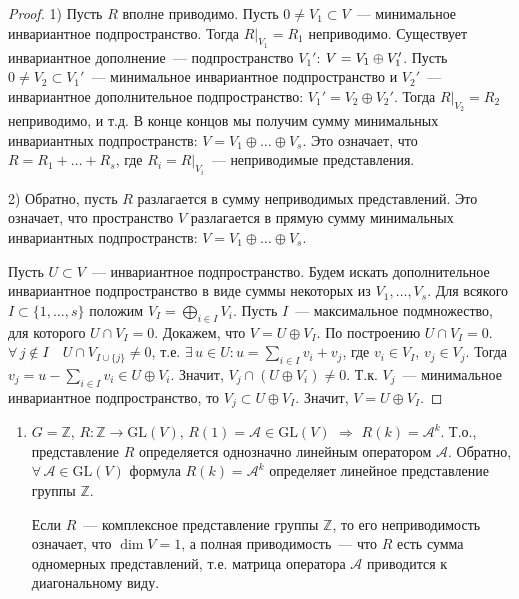 \documentclass[a4paper]{article}
\newcommand*{\p}[1]{#1\nobreak\discretionary{}{\hbox{$\mathsurround=0pt #1$}}{}}
\begin{document}
\begin{proof}
1) Пусть $R$ вполне приводимо. Пусть $0\neq V_1\subset V$~---
минимальное инвариантное подпространство. Тогда $R|_{V_1}=R_1$
неприводимо. Существует инвариантное дополнение~--- подпространство
$V_1'$: $V\p=V_1\oplus V_1'$. Пусть $0\neq V_2\subset V_1'$~---
минимальное инвариантное подпространство и $V_2'$~--- инвариантное
дополнительное подпространство: $V_1'=V_2\oplus V_2'$. Тогда
$R|_{V_2}=R_2$ неприводимо, и т.д. В конце концов мы получим сумму
минимальных инвариантных подпространств: $V=V_1\oplus\ldots\oplus
V_s$. Это означает, что $R=R_1+\ldots+R_s$, где $R_i=R|_{V_i}$~---
неприводимые представления.

2) Обратно, пусть $R$ разлагается в сумму неприводимых
представлений. Это означает, что пространство $V$ разлагается в
прямую сумму минимальных инвариантных подпространств:
$V=V_1\oplus\ldots\oplus V_s$.

Пусть $U\subset V$~--- инвариантное подпространство. Будем искать
дополнительное инвариантное подпространство в виде суммы некоторых
из $V_1,\ldots, V_s$. Для всякого $I\subset\{1,\ldots,s\}$ положим
$V_I=\bigoplus\limits_{i\in I}V_i$. Пусть $I$~--- максимальное
подмножество, для которого $U\cap V_I=0$. Докажем, что $V=U\oplus
V_I$. По построению $U\cap V_I=0$. $\forall \, j\not\in I\quad U\cap
V_{I\cup\{j\}}\neq 0$, т.е. $\exists \, u\in U: u=\sum\limits_{i\in
I}v_i+v_j$, где $v_i\in V_I$, $v_j\in V_j$. Тогда
$v_j=u-\sum\limits_{i\in I}v_i\in U\oplus V_i$. Значит, $V_j\cap
(U\oplus V_i)\neq 0$. Т.к. $V_j$~--- минимальное инвариантное
подпространство, то $V_j\subset U\oplus V_I$. Значит, $V=U\oplus
V_I$.
\end{proof}

\prim
\begin{enumerate}
  \item $G=\mathbb{Z}$, $R\colon \mathbb{Z}\to \mathrm{GL}(V)$, $R(1)=\mathcal{A}\in
  \mathrm{GL}(V)$ $\Rightarrow$ $R(k)=\mathcal{A}^k$. Т.о., представление $R$
  определяется однозначно линейным оператором $\mathcal{A}$.
  Обратно, $\forall \, \mathcal{A}\in \mathrm{GL}(V)$ формула
  $R(k)=\mathcal{A}^k$ определяет линейное представление группы
  $\mathbb{Z}$.

  Если $R$~--- комплексное представление группы $\mathbb{Z}$, то его
  неприводимость означает, что $\dim V=1$, а полная приводимость~---
  что $R$ есть сумма одномерных представлений, т.е. матрица
  оператора $\mathcal{A}$ приводится к диагональному виду.
\end{enumerate}
\end{document}
